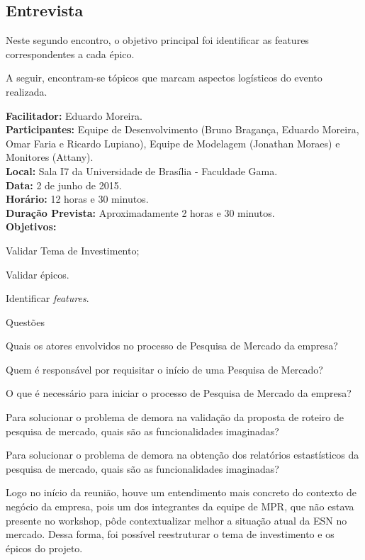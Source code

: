 	\subsection{Entrevista}

		Neste segundo encontro, o objetivo principal foi identificar as features correspondentes a cada épico.
		
		A seguir, encontram-se tópicos que marcam aspectos logísticos do evento realizada.

		\noindent
		\textbf{Facilitador: }Eduardo Moreira.\\
		\textbf{Participantes: }Equipe de Desenvolvimento (Bruno Bragança, Eduardo Moreira, Omar Faria e Ricardo Lupiano), Equipe de Modelagem (Jonathan Moraes) e Monitores (Attany).\\
		\textbf{Local: }Sala I7 da Universidade de Brasília - Faculdade Gama.\\
		\textbf{Data: }2 de junho de 2015.\\
		\textbf{Horário: }12 horas e 30 minutos.\\
		\textbf{Duração Prevista: }Aproximadamente 2 horas e 30 minutos.\\
		\textbf{Objetivos:}
		\begin{itemize}
		{
			\item Validar Tema de Investimento;
			\item Validar épicos.
			\item Identificar \textit{features}.
		}
		\end{itemize}

		\noindent
		Questões
		\begin{itemize}
		{
			\item Quais os atores envolvidos no processo de Pesquisa de Mercado da empresa?
			\item Quem é responsável por requisitar o início de uma Pesquisa de Mercado?
			\item O que é necessário para iniciar o processo de Pesquisa de Mercado da empresa?
			\item Para solucionar o problema de demora na validação da proposta de roteiro de pesquisa de mercado, quais são as funcionalidades imaginadas?
			\item Para solucionar o problema de demora na obtenção dos relatórios estastísticos da pesquisa de mercado, quais são as funcionalidades imaginadas? 
		}
		\end{itemize}

		Logo no início da reunião, houve um entendimento mais concreto do contexto de negócio da empresa, pois um dos integrantes da equipe de MPR, que não estava presente no workshop, pôde contextualizar melhor a situação atual da ESN no mercado. Dessa forma, foi possível reestruturar o tema de investimento e os épicos do projeto.

